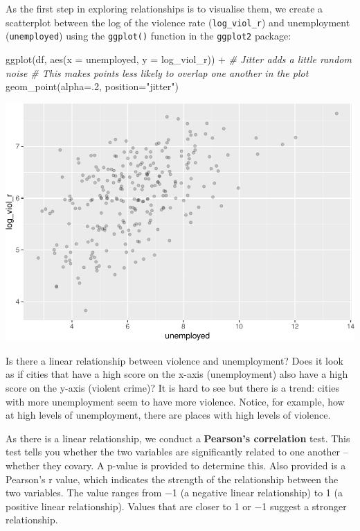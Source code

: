 \documentclass[
]{book}
\newenvironment{Shaded}{\begin{snugshade}}{\end{snugshade}}
\newcommand{\AttributeTok}[1]{\textcolor[rgb]{0.77,0.63,0.00}{#1}}
\newcommand{\CommentTok}[1]{\textcolor[rgb]{0.56,0.35,0.01}{\textit{#1}}}
\newcommand{\DecValTok}[1]{\textcolor[rgb]{0.00,0.00,0.81}{#1}}
\newcommand{\FunctionTok}[1]{\textcolor[rgb]{0.00,0.00,0.00}{#1}}
\newcommand{\NormalTok}[1]{#1}
\newcommand{\SpecialCharTok}[1]{\textcolor[rgb]{0.00,0.00,0.00}{#1}}
\newcommand{\StringTok}[1]{\textcolor[rgb]{0.31,0.60,0.02}{#1}}
\begin{document}
As the first step in exploring relationships is to visualise them, we create a scatterplot between the log of the violence rate (\texttt{log\_viol\_r}) and unemployment (\texttt{unemployed}) using the \texttt{ggplot()} function in the \texttt{ggplot2} package:

\begin{Shaded}
\begin{Highlighting}[]
\FunctionTok{ggplot}\NormalTok{(df, }\FunctionTok{aes}\NormalTok{(}\AttributeTok{x =}\NormalTok{ unemployed, }\AttributeTok{y =}\NormalTok{ log\_viol\_r)) }\SpecialCharTok{+} 
\CommentTok{\# Jitter adds a little random noise }
\CommentTok{\# This makes points less likely to overlap one another in the plot }
  \FunctionTok{geom\_point}\NormalTok{(}\AttributeTok{alpha=}\NormalTok{.}\DecValTok{2}\NormalTok{, }\AttributeTok{position=}\StringTok{"jitter"}\NormalTok{)}
\end{Highlighting}
\end{Shaded}

\includegraphics{08-strength-relationship_files/figure-latex/unnamed-chunk-9-1.pdf}

Is there a linear relationship between violence and unemployment? Does it look as if cities that have a high score on the x-axis (unemployment) also have a high score on the y-axis (violent crime)? It is hard to see but there is a trend: cities with more unemployment seem to have more violence. Notice, for example, how at high levels of unemployment, there are places with high levels of violence.

As there is a linear relationship, we conduct a \textbf{Pearson's correlation} test. This test tells you whether the two variables are significantly related to one another -- whether they covary. A p-value is provided to determine this. Also provided is a Pearson's r value, which indicates the strength of the relationship between the two variables. The value ranges from −1 (a negative linear relationship) to 1 (a positive linear relationship). Values that are closer to 1 or −1 suggest a stronger relationship.
\end{document}
